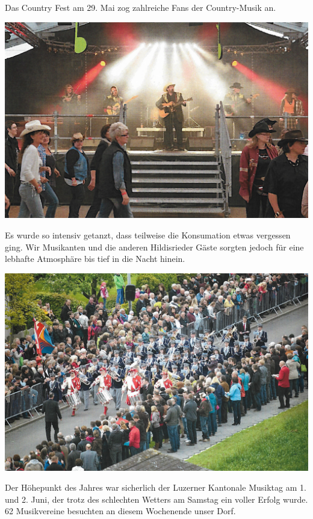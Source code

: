 \begin{history}
    Das Country Fest am 29. Mai zog zahlreiche Fans der Country-Musik an.

    \begin{MulticolFigure}
        \centering
        \includegraphics[width=0.93\linewidth]{./chap/2001-2024/2013/Country.jpg}
    \end{MulticolFigure}

    Es wurde so intensiv getanzt, dass teilweise die Konsumation etwas vergessen
    ging. Wir Musikanten und die anderen Hildisrieder Gäste sorgten jedoch für
    eine lebhafte Atmosphäre bis tief in die Nacht hinein.

    \begin{MulticolFigure}
        \centering
        \includegraphics[width=0.93\linewidth]{./chap/2001-2024/2013/Marschmusikstrecke.jpg}
    \end{MulticolFigure}

    Der Höhepunkt des Jahres war sicherlich der Luzerner Kantonale Musiktag am
    1. und 2. Juni, der trotz des schlechten Wetters am Samstag ein voller
    Erfolg wurde. 62 Musikvereine besuchten an diesem Wochenende unser Dorf.


\end{history}
